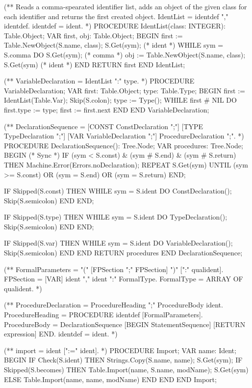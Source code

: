 \documentclass[utf8]{lgu}
\begin{document}
\begin{modula2long}
(** Reads a comma-spearated identifier list, adds an object of the given
    class for each identifier and returns the first created object.
     IdentList = identdef {"," identdef}.
     identdef = ident. *)
PROCEDURE IdentList(class: INTEGER): Table.Object;
VAR first, obj: Table.Object;
BEGIN
  first := Table.NewObject(S.name, class);
  S.Get(sym); (* ident *)
  WHILE sym = S.comma DO
    S.Get(sym); (* comma *)
    obj := Table.NewObject(S.name, class);
    S.Get(sym) (* ident *)
  END
RETURN first END IdentList;

(** VariableDeclaration = IdentList ":" type. *)
PROCEDURE VariableDeclaration;
VAR first: Table.Object;
  type: Table.Type;
BEGIN
  first := IdentList(Table.Var);
  Skip(S.colon);
  type := Type();
  WHILE first # NIL DO
    first.type := type;
    first := first.next
  END
END VariableDeclaration;

(** DeclarationSequence = [CONST {ConstDeclaration ";"}]
    [TYPE {TypeDeclaration ";"}] [VAR {VariableDeclaration ";"}]
    {ProcedureDeclaration ";"}. *)
PROCEDURE DeclarationSequence(): Tree.Node;
VAR procedures: Tree.Node;
BEGIN
  (* Sync *)
  IF (sym < S.const) & (sym # S.end) & (sym # S.return) THEN
    Machine.Error(Errors.noDeclaration);
    REPEAT
      S.Get(sym)
    UNTIL (sym >= S.const) OR (sym = S.end) OR (sym = S.return)
  END;

  IF Skipped(S.const) THEN
    WHILE sym = S.ident DO
      ConstDeclaration();
      Skip(S.semicolon)
    END
  END;

  IF Skipped(S.type) THEN
    WHILE sym = S.ident DO
      TypeDeclaration();
      Skip(S.semicolon)
    END
  END;

  IF Skipped(S.var) THEN
    WHILE sym = S.ident DO
      VariableDeclaration();
      Skip(S.semicolon)
    END
  END
RETURN procedures END DeclarationSequence;

(** FormalParameters = "(" [FPSection {";" FPSection}] ")" [":" qualident].
     FPSection = [VAR] ident {"," ident} ":" FormalType.
     FormalType = {ARRAY OF} qualident. *)

(** ProcedureDeclaration = ProcedureHeading ";" ProcedureBody ident.
     ProcedureHeading = PROCEDURE identdef [FormalParameters].
     ProcedureBody = DeclarationSequence [BEGIN StatementSequence]
    [RETURN expression] END.
     identdef = ident. *)

(** import = ident [":=" ident]. *)
PROCEDURE Import;
VAR name: Ident;
BEGIN
  IF Check(S.ident) THEN
    Strings.Copy(S.name, name);
    S.Get(sym);
    IF Skipped(S.becomes) THEN
      Table.Import(name, S.name, modName);
      S.Get(sym)
    ELSE
      Table.Import(name, name, modName)
    END
  END
END Import;


\end{modula2long}
\end{document}
